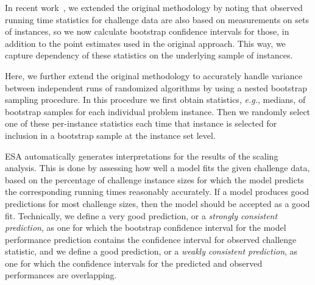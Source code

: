 \documentclass[aic]{iosart2x}
\newcommand{\eg}{\emph{e.g.}}
\begin{document}
In recent work~\cite{MuHoo15}, we extended the original methodology by noting that observed running time statistics for challenge data are also based on measurements on sets of instances, so we now calculate bootstrap confidence intervals for those, in addition to the point estimates used in the original approach. This way, we capture dependency of these statistics on the underlying sample of instances.

Here, we further extend the original methodology to accurately handle variance between independent runs of randomized algorithms by using a nested bootstrap sampling procedure. In this procedure we first obtain statistics, \eg{}, medians, of bootstrap samples for each individual problem instance. Then we randomly select one of these per-instance statistics each time that instance is selected for inclusion in a bootstrap sample at the instance set level. 


\label{sec:auto-interpretation}

ESA automatically generates interpretations for the results of the scaling analysis. This is done by assessing how well a model fits the given challenge data, based on the percentage of challenge instance sizes for which the model predicts the corresponding running times reasonably accurately. If a model produces good predictions for most challenge sizes, then the model should be accepted as a good fit. Technically, we define a very good prediction, or a \emph{strongly consistent prediction}, as one for which the bootstrap confidence interval for the model performance prediction contains the confidence interval for observed challenge statistic, and we define a good prediction, or a \emph{weakly consistent prediction}, as one for which the confidence intervals for the predicted and observed performances are overlapping.
\end{document}
